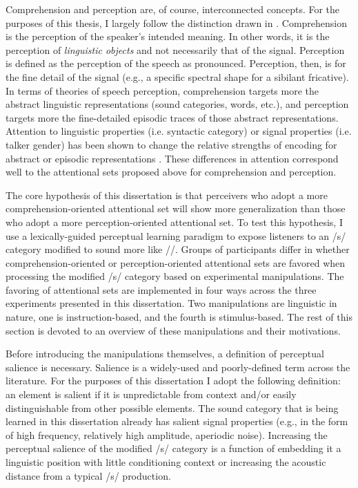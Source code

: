 Comprehension and perception are, of course, interconnected concepts. 
For the purposes of this thesis, I largely follow the distinction drawn in \citet{Pitt2012}. 
Comprehension is the perception of the speaker's intended meaning.
In other words, it is the perception of \emph{linguistic objects} and not necessarily that of the signal.
Perception is defined as the perception of the speech as pronounced.
Perception, then, is for the fine detail of the signal (e.g., a specific spectral shape for a sibilant fricative). 
In terms of theories of speech perception, comprehension targets more the abstract linguistic representations (sound categories, words, etc.), and perception targets more the fine-detailed episodic traces of those abstract representations.
Attention to linguistic properties (i.e. syntactic category) or signal properties (i.e. talker gender) has been shown to change the relative strengths of encoding for abstract or episodic representations \citep{Goldinger1996,Theodore2015}.
These differences in attention correspond well to the attentional sets proposed above for comprehension and perception.

The core hypothesis of this dissertation is that perceivers who adopt a more comprehension-oriented attentional set will show more generalization than those who adopt a more perception-oriented attentional set.
To test this hypothesis, I use a lexically-guided perceptual learning paradigm to expose listeners to an /s/ category modified to sound more like /\textesh/.  
Groups of participants differ in whether comprehension-oriented or perception-oriented attentional sets are favored when processing the modified /s/ category based on experimental manipulations.
The favoring of attentional sets are implemented in four ways across the three experiments presented in this dissertation.  
Two manipulations are linguistic in nature, one is instruction-based, and the fourth is stimulus-based.
The rest of this section is devoted to an overview of these manipulations and their motivations.

Before introducing the manipulations themselves, a definition of perceptual salience is necessary.
Salience is a widely-used and poorly-defined term across the literature.
For the purposes of this dissertation I adopt the following definition:  an element is salient if it is unpredictable from context and/or easily distinguishable from other possible elements.  
The sound category that is being learned in this dissertation already has salient signal properties (e.g., in the form of high frequency, relatively high amplitude, aperiodic noise).
Increasing the perceptual salience of the modified /s/ category is a function of embedding it a linguistic position with little conditioning context or increasing the acoustic distance from a typical /s/ production.

